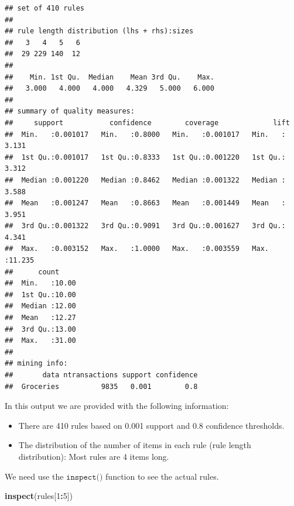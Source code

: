 \documentclass[
]{book}
\newenvironment{Shaded}{\begin{snugshade}}{\end{snugshade}}
\newcommand{\DecValTok}[1]{\textcolor[rgb]{0.00,0.00,0.81}{#1}}
\newcommand{\KeywordTok}[1]{\textcolor[rgb]{0.13,0.29,0.53}{\textbf{#1}}}
\newcommand{\NormalTok}[1]{#1}
\newcommand{\OperatorTok}[1]{\textcolor[rgb]{0.81,0.36,0.00}{\textbf{#1}}}
\providecommand{\tightlist}{%
  \setlength{\itemsep}{0pt}\setlength{\parskip}{0pt}}
\begin{document}
\begin{verbatim}
## set of 410 rules
## 
## rule length distribution (lhs + rhs):sizes
##   3   4   5   6 
##  29 229 140  12 
## 
##    Min. 1st Qu.  Median    Mean 3rd Qu.    Max. 
##   3.000   4.000   4.000   4.329   5.000   6.000 
## 
## summary of quality measures:
##     support           confidence        coverage             lift       
##  Min.   :0.001017   Min.   :0.8000   Min.   :0.001017   Min.   : 3.131  
##  1st Qu.:0.001017   1st Qu.:0.8333   1st Qu.:0.001220   1st Qu.: 3.312  
##  Median :0.001220   Median :0.8462   Median :0.001322   Median : 3.588  
##  Mean   :0.001247   Mean   :0.8663   Mean   :0.001449   Mean   : 3.951  
##  3rd Qu.:0.001322   3rd Qu.:0.9091   3rd Qu.:0.001627   3rd Qu.: 4.341  
##  Max.   :0.003152   Max.   :1.0000   Max.   :0.003559   Max.   :11.235  
##      count      
##  Min.   :10.00  
##  1st Qu.:10.00  
##  Median :12.00  
##  Mean   :12.27  
##  3rd Qu.:13.00  
##  Max.   :31.00  
## 
## mining info:
##       data ntransactions support confidence
##  Groceries          9835   0.001        0.8
\end{verbatim}

In this output we are provided with the following information:

\begin{itemize}
\tightlist
\item
  There are 410 rules based on 0.001 support and 0.8 confidence thresholds.
\item
  The distribution of the number of items in each rule (rule length distribution): Most rules are 4 items long.
\end{itemize}

We need use the \(\texttt{inspect()}\) function to see the actual rules.

\begin{Shaded}
\begin{Highlighting}[]
\KeywordTok{inspect}\NormalTok{(rules[}\DecValTok{1}\OperatorTok{:}\DecValTok{5}\NormalTok{])}
\end{Highlighting}
\end{Shaded}
\end{document}
